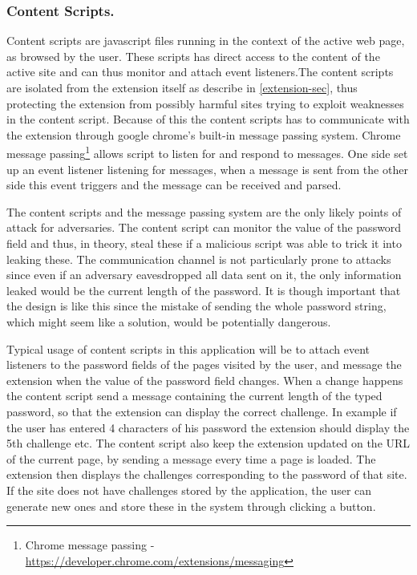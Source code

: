\subsubsection{Content Scripts.}
Content scripts are javascript files running in the context of the active web page, as browsed by the user. These scripts has direct access to the content of the active site and can thus monitor and attach event listeners.The content scripts are isolated from the extension itself as describe in \autoref{extension-sec}, thus protecting the extension from possibly harmful sites trying to exploit weaknesses in the content script. Because of this the content scripts has to communicate with the extension through google chrome's built-in message passing system. Chrome message passing\footnote{Chrome message passing - \url{https://developer.chrome.com/extensions/messaging}} allows script to listen for and respond to messages. One side set up an event listener listening for messages, when a message is sent from the other side this event triggers and the message can be received and parsed. 
\par The content scripts and the message passing system are the only likely points of attack for adversaries. The content script can monitor the value of the password field and thus, in theory, steal these if a malicious script was able to trick it into leaking these. The communication channel is not particularly prone to attacks since even if an adversary eavesdropped all data sent on it, the only information leaked would be the current length of the password. It is though important that the design is like this since the mistake of sending the whole password string, which might seem like a solution, would be potentially dangerous. 
\par Typical usage of content scripts in this application will be to attach event listeners to the password fields of the pages visited by the user, and message the extension when the value of the password field changes. When a change happens the content script send a message containing the current length of the typed password, so that the extension can display the correct challenge. In example if the user has entered 4 characters of his password the extension should display the 5th challenge etc. The content script also keep the extension updated on the URL of the current page, by sending a message every time a page is loaded. The extension then displays the challenges corresponding to the password of that site. If the site does not have challenges stored by the application, the user can generate new ones and store these in the system through clicking a button.







